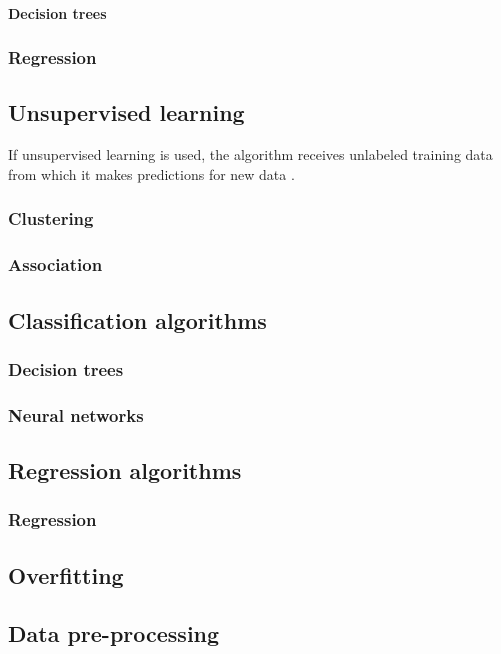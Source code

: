 	\paragraph{Decision trees}
\subsubsection{Regression}
\subsection{Unsupervised learning}
	If unsupervised learning is used, the algorithm receives unlabeled training data from which it makes predictions for new data \cite{BOOK:3}. 
\subsubsection{Clustering}
\subsubsection{Association}


\subsection{Classification algorithms}
\subsubsection{Decision trees}
\subsubsection{Neural networks}

\subsection{Regression algorithms}
\subsubsection{Regression}

\subsection{Overfitting}

\subsection{Data pre-processing}


